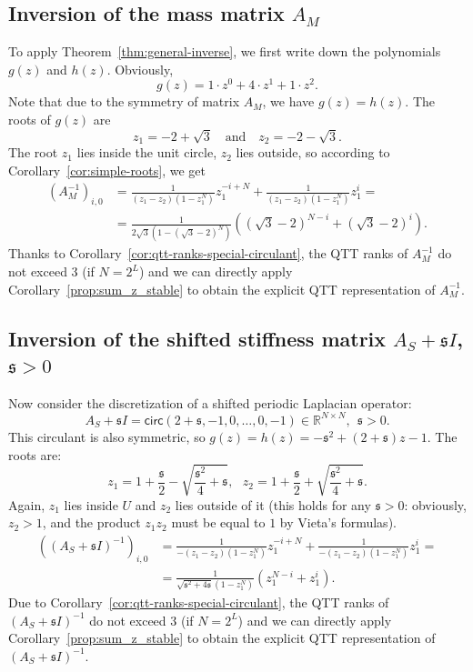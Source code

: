 \documentclass[a4paper]{article}
\newcommand{\LL}{L}
\newcommand{\mass}{A_M}
\newcommand{\lap}{A_S}
\newcommand{\base}{2}
\newcommand{\shift}{\mathfrak{s}}
\begin{document}
\subsection{Inversion of the mass matrix $\mass$} 


    To apply Theorem~\ref{thm:general-inverse}, we first write down the polynomials $g(z)$ and $h(z)$.
    Obviously, \[g(z) = 1\cdot z^0 + 4 \cdot z^1 + 1 \cdot z^2.\]
    Note that due to the symmetry of matrix $\mass$, we have $g(z) = h(z)$.
    The roots of $g(z)$ are 
    \[z_{1} = -2+\sqrt{3} \quad \text{and}\quad z_{2} = -2- \sqrt{3}.\]
    The root $z_1$  lies inside the unit circle, $z_2$ lies outside, so according to Corollary~\ref{cor:simple-roots}, we get
    \begin{align*}
    (\mass^{-1})_{i,0} 
    &=
    \frac{1}{(z_1-z_2)(1-z_1^N)}z_1^{-i+N}
    +
    \frac{1}{(z_1-z_2)(1-z_1^N)}z_1^{i}
    = \\ &=
    \frac{1}{2\sqrt{3}(1-(\sqrt{3}-2)^N)}
    \left(
    (\sqrt{3}-2)^{N-i} + (\sqrt{3}-2)^{i}
    \right).
    \end{align*}
    Thanks to Corollary~\ref{cor:qtt-ranks-special-circulant}, the QTT ranks of $\mass^{-1}$ do not exceed $3$ (if $N = \base^\LL$) and we can directly apply Corollary~\ref{prop:sum_z_stable} to obtain the explicit QTT representation of $\mass^{-1}$.
    
    
\subsection{Inversion of the shifted stiffness matrix $\lap+  \shift I$, $\shift>0$} \label{sec:circ_1dode}
    
    Now consider the discretization of a shifted periodic Laplacian operator:
    \[
    \lap + \shift I = \mathsf{circ}(2+\shift,-1,0,\dots,0,-1) \in \mathbb{R}^{N \times N},~~\shift > 0.
    \]
    This circulant is also symmetric, so $g(z) = h(z) = -\shift^2 + (2+\shift)z - 1$.
    The roots are:
    \[
    z_{1} = 1 + \frac{\shift}{2} - \sqrt{\frac{\shift^2}{4}+\shift},
    ~~~
    z_{2} = 1 + \frac{\shift}{2} + \sqrt{\frac{\shift^2}{4}+\shift}.
    \]
    Again, $z_1$ lies inside $U$ and $z_2$ lies outside of it (this holds for any $\shift > 0$: obviously, $z_2 > 1$, and the product $z_1z_2$ must be equal to $1$ by Vieta's formulas).
    \begin{align*}
    \left((\lap + \shift I)^{-1}\right)_{i,0} 
    &=
    \frac{1}{-(z_1-z_2)(1-z_1^N)}z_1^{-i+N}
    +
    \frac{1}{-(z_1-z_2)(1-z_1^N)}z_1^{i}
    = \\ &=
    \frac{1}{\sqrt{\shift^2 + 4\shift}(1-z_1^N)}
    \left(
    z_1^{N-i} + z_1^{i}
    \right).
    \end{align*}
    Due to Corollary~\ref{cor:qtt-ranks-special-circulant}, the QTT ranks of $(\lap+\shift I)^{-1}$ do not exceed $3$ (if $N = \base^\LL$) and we can directly apply Corollary~\ref{prop:sum_z_stable} to obtain the explicit QTT representation of $(\lap + \shift I)^{-1}$.
\end{document}
